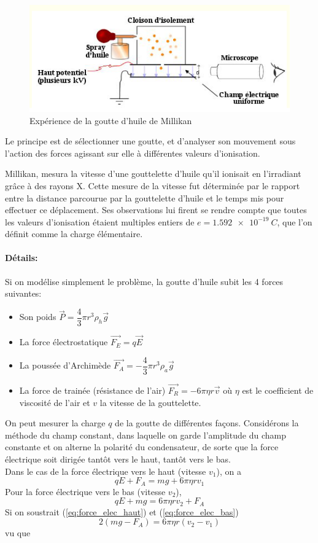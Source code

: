 \begin{figure}[ht]
    \centering
    \includegraphics[scale=0.60]{Images1/millikan.PNG}
    \caption{Expérience de la goutte d'huile de Millikan}
\end{figure}

Le principe est de sélectionner une goutte, et  d'analyser son mouvement sous l'action des forces agissant sur elle  à différentes valeurs d'ionisation.

Millikan, mesura la vitesse d'une gouttelette d'huile qu'il ionisait en l'irradiant grâce à des rayons X. Cette mesure de la vitesse fut déterminée par le rapport entre la distance parcourue par la gouttelette d'huile et le temps mis pour effectuer ce déplacement. Ses observations lui firent se rendre compte que toutes les valeurs d'ionisation étaient multiples entiers de $e=\SI{1.592e-19}{C}$, que l'on définit comme la charge élémentaire.

\paragraph{Détails:} Si on modélise simplement le problème, la goutte d'huile subit les 4 forces suivantes:
\begin{itemize}
    \item Son poids $\Vec{P}=\dfrac{4}{3}\pi r^3 \rho_h\Vec{g}$
    \item La force électrostatique $\Vec{F_E}=q\Vec{E}$
    \item La poussée d'Archimède $\Vec{F_A}=-\dfrac{4}{3}\pi r^3 \rho_a \Vec{g}$
    \item La force de trainée (résistance de l'air) $\Vec{F_R}=-6\pi\eta r\Vec{v}$ où $\eta$ est le coefficient de viscosité de l'air et $v$ la vitesse de la gouttelette.
\end{itemize}
On peut mesurer la charge $q$ de la goutte de différentes façons. Considérons la méthode du champ constant, dans laquelle on garde l'amplitude du champ constante et on alterne la polarité du condensateur, de sorte que la force électrique soit dirigée tantôt vers le haut, tantôt vers le bas. \\[0,2cm]
Dans le cas de la force électrique vers le haut (vitesse $v_1$), on a
\begin{equation}
    qE+F_A = mg+6\pi\eta rv_1
    \label{eq:force_elec_haut}
\end{equation}
    Pour la force électrique vers le bas (vitesse $v_2$),
\begin{equation}
    qE+mg = 6\pi\eta rv_2 + F_A
    \label{eq:force_elec_bas}
\end{equation}
Si on soustrait (\ref{eq:force_elec_haut}) et (\ref{eq:force_elec_bas})
\[
    2(mg-F_A)=6\pi\eta r(v_2-v_1)
\]
vu que

